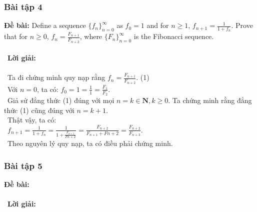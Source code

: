 \documentclass[a4paper]{article}
\begin{document}
\subsubsection{Bài tập 4}
\textbf{Đề bài: }Define a sequence $\{f_n\}_{n=0}^\infty$ as $f_0 = 1$ and for $n \geq 1$, $f_{n+1} = \frac{1}{1+f_n}$. Prove that for $n \geq 0$, $f_n = \frac{F_{n+1}}{F_{n+2}}$, where $\{F_n\}_{n=0}^\infty$ is the Fibonacci sequence. \\\ \\\
\textbf{Lời giải: } \\\ \\\
Ta đi chứng minh quy nạp rằng $f_n = \frac{F_{n+1}}{F_{n+2}}$. (1)\\\
Với $n = 0$, ta có: $f_0 = 1 = \frac{1}{1} = \frac{F_1}{F_2}$. \\\
Giả sử đẳng thức (1) đúng với mọi $n = k \in \textbf{N}, k \geq 0$.
Ta chứng minh rằng đẳng thức (1) cũng đúng với $n = k+1$.\\\
Thật vậy, ta có: \\\
$f_{n+1} = \frac{1}{1+f_n} = \frac{1}{1+\frac{F_{n+1}}{F{n+2}}} = \frac{F_{n+2}}{F_{n+1} + F{n+2}} = \frac{F_{n+2}}{F_{n+3}}$. \\\
Theo nguyên lý quy nạp, ta có điều phải chứng minh.
\clearpage
\subsubsection{Bài tập 5}
\textbf{Đề bài:} 
\\\ \\\
\textbf{Lời giải:} \\\ \\\
\clearpage
\end{document}

